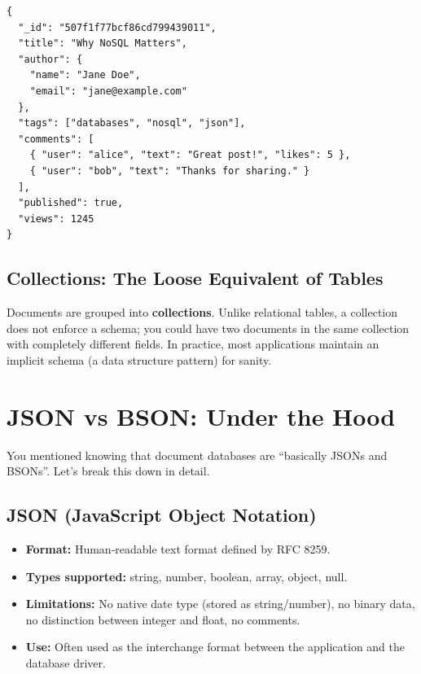 \documentclass[12pt,a4paper]{article}
\begin{document}
\begin{lstlisting}[caption=A typical document representing a blog post, label=lst:blogdoc]
{
  "_id": "507f1f77bcf86cd799439011",
  "title": "Why NoSQL Matters",
  "author": {
    "name": "Jane Doe",
    "email": "jane@example.com"
  },
  "tags": ["databases", "nosql", "json"],
  "comments": [
    { "user": "alice", "text": "Great post!", "likes": 5 },
    { "user": "bob", "text": "Thanks for sharing." }
  ],
  "published": true,
  "views": 1245
}
\end{lstlisting}

\subsection{Collections: The Loose Equivalent of Tables}
Documents are grouped into \textbf{collections}. Unlike relational tables, a collection does not enforce a schema; you could have two documents in the same collection with completely different fields. In practice, most applications maintain an implicit schema (a data structure pattern) for sanity.

\section{JSON vs BSON: Under the Hood}
You mentioned knowing that document databases are ``basically JSONs and BSONs''. Let's break this down in detail.

\subsection{JSON (JavaScript Object Notation)}
\begin{itemize}
    \item \textbf{Format:} Human-readable text format defined by RFC 8259.
    \item \textbf{Types supported:} string, number, boolean, array, object, null.
    \item \textbf{Limitations:} No native date type (stored as string/number), no binary data, no distinction between integer and float, no comments.
    \item \textbf{Use:} Often used as the interchange format between the application and the database driver.
\end{itemize}
\end{document}
